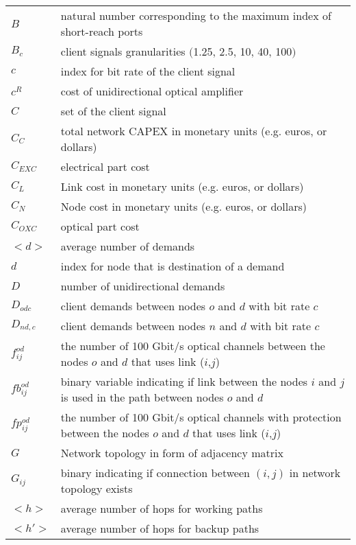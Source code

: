 \begin{table}[!ht]
\renewcommand{\arraystretch}{1.3}
	\flushright	
	\begin{tabular}{l p{}}
$B$ & natural number corresponding to the maximum index of short-reach ports \\
$B_c $ & client signals granularities $($1.25, 2.5, 10, 40, 100$)$ \\[3mm]

$c$ & index for bit rate of the client signal \\
$c^R$ & cost of unidirectional optical amplifier \\
$C$ & set of the client signal \\
$C_C$ & total network CAPEX in monetary units (e.g. euros, or dollars)\\
$C_{EXC}$ & electrical part cost \\
$C_L$ & Link cost in monetary units (e.g. euros, or dollars)\\
$C_N$ & Node cost in monetary units (e.g. euros, or dollars)\\
$C_{OXC}$ & optical part cost \\ [3mm]

$<d>$ & average number of demands \\
$d$ & index for node that is destination of a demand \\
$D$ & number of unidirectional demands\\
$D_{odc}$ & client demands between nodes $o$ and $d$ with bit rate $c$\\
$D_{nd,c}$ & client demands between nodes $n$ and $d$ with bit rate $c$\\[3mm]

$f_{ij}^{od}$ & the number of 100 Gbit/s optical channels between the nodes $o$ and $d$ that uses link ($i$,$j$) \\
$fb_{ij}^{od}$ & binary variable indicating if link between the nodes $i$ and $j$ is used in the path between nodes $o$ and $d$ \\
$fp_{ij}^{od}$ & the number of 100 Gbit/s optical channels with protection between the nodes $o$ and $d$ that uses link ($i$,$j$) \\[3mm]

$G$ & Network topology in form of adjacency matrix \\
$G_{ij}$ & binary indicating if connection between $(i,j)$ in network topology exists \\ [3mm]

$<h>$ & average number of hops for working paths \\
$<h'>$ & average number of hops for backup paths \\ [3mm]


\end{tabular}
\end{table}
